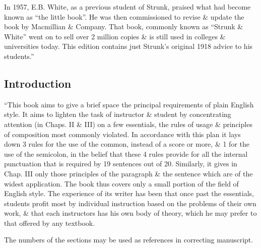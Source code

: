 \documentclass{article}
\begin{document}
In 1957, E.B. White, as a previous student of Strunk, praised what had become known as ``the little book''. He was then commissioned to revise \& update the book by Macmillian \& Company. That book, commonly known as ``Strunk \& White'' went on to sell over 2 million copies \& is still used in colleges \& universities today. This edition contains just Strunk's original 1918 advice to his students.''


\subsection*{Introduction}
``This book aims to give a brief space the principal requirements of plain English style. It aims to lighten the task of instructor \& student by concentrating attention (in Chaps. II \& III) on a few essentials, the rules of usage \& principles of composition most commonly violated. In accordance with this plan it lays down 3 rules for the use of the common, instead of a score or more, \& 1 for the use of the semicolon, in the belief that these 4 rules provide for all the internal punctuation that is required by 19 sentences out of 20. Similarly, it gives in Chap. III only those principles of the paragraph \& the sentence which are of the widest application. The book thus covers only a small portion of the field of English style. The experience of its writer has been that once past the essentials, students profit most by individual instruction based on the problems of their own work, \& that each instructors has his own body of theory, which he may prefer to that offered by any textbook.

The numbers of the sections may be used as references in correcting manuscript.
\end{document}
